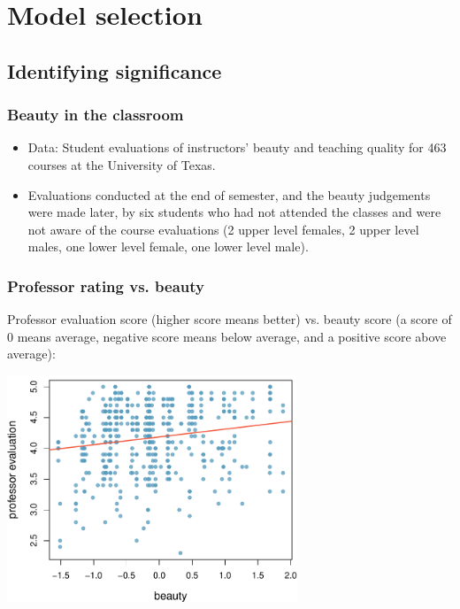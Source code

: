 
\section{Model selection}


\subsection{Identifying significance}


\begin{frame}
\frametitle{Beauty in the classroom}

\begin{itemize}

\item Data: Student evaluations of instructors' beauty and teaching quality for 463 courses at the University of Texas.

\item Evaluations conducted at the end of semester, and the beauty judgements were made later, by six students who had not attended the classes and were not aware of the course evaluations (2 upper level females, 2 upper level males, one lower level female, one lower level male).

\end{itemize}


\end{frame}


\begin{frame}
\frametitle{Professor rating vs. beauty}

Professor evaluation score (higher score means better) vs. beauty score (a score of 0 means average, negative score means below average, and a positive score above average):

\begin{center}
\includegraphics[width=0.65\textwidth]{9-2_model_select/figures/beauty/beauty_profeval}
\end{center}

\end{frame}

